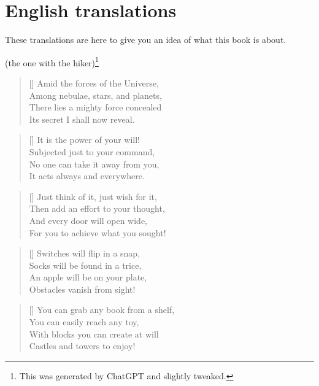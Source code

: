 \section*{English translations}
These translations are here to give you an idea of what this book is about.


\PlainPoemTitle
{}
\vspace{-5mm}
\begin{center}
	(the one with the hiker)\footnote{This was generated by ChatGPT and slightly tweaked.}
\end{center}

\begin{multicols}{2}
	
	
	\begin{verse}[\versewidth]
		Amid the forces of the Universe,\\
		Among nebulae, stars, and planets,\\
		There lies a mighty force concealed\\
		Its secret I shall now reveal.
	\end{verse}
	
	\begin{verse}[\versewidth]
		It is the power of your will!\\
		Subjected just to your command,\\
		No one can take it away from you,\\
		It acts always and everywhere.
	\end{verse}
	
	\begin{verse}[\versewidth]
		Just think of it, just wish for it,\\
		Then add an effort to your thought,\\
		And every door will open wide,\\
		For you to achieve what you sought!
	\end{verse}
	
	
	\begin{verse}[\versewidth]
		Switches will flip in a snap,\\
		Socks will be found in a trice,\\
		An apple will be on your plate,\\
		Obstacles vanish from sight!
	\end{verse}
	
	\begin{verse}[\versewidth]
		You can grab any book from a shelf,\\
		You can easily reach any toy,\\
		With blocks you can create at will\\
		Castles and towers to enjoy!
	\end{verse}
	

\end{multicols}

